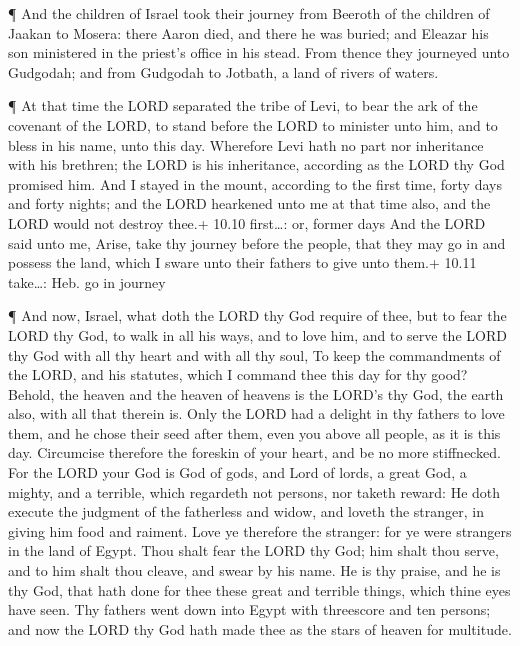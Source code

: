  ¶ And the children of Israel took their journey from
Beeroth of the children of Jaakan to Mosera: there Aaron died, and there
he was buried; and Eleazar his son ministered in the priest's office in
his stead.  From thence they journeyed unto Gudgodah; and
from Gudgodah to Jotbath, a land of rivers of waters.

 ¶ At that time the LORD separated the tribe of Levi, to
bear the ark of the covenant of the LORD, to stand before the LORD to
minister unto him, and to bless in his name, unto this day. 
Wherefore Levi hath no part nor inheritance with his brethren; the LORD
is his inheritance, according as the LORD thy God promised him.
 And I stayed in the mount, according to the first time,
forty days and forty nights; and the LORD hearkened unto me at that time
also, and the LORD would not destroy thee.+ 10.10 first\ldots: or,
former days  And the LORD said unto me, Arise, take thy
journey before the people, that they may go in and possess the land,
which I sware unto their fathers to give unto them.+ 10.11 take\ldots:
Heb. go in journey

 ¶ And now, Israel, what doth the LORD thy God require of
thee, but to fear the LORD thy God, to walk in all his ways, and to love
him, and to serve the LORD thy God with all thy heart and with all thy
soul,  To keep the commandments of the LORD, and his
statutes, which I command thee this day for thy good? 
Behold, the heaven and the heaven of heavens is the LORD's thy God, the
earth also, with all that therein is.  Only the LORD had a
delight in thy fathers to love them, and he chose their seed after them,
even you above all people, as it is this day.  Circumcise
therefore the foreskin of your heart, and be no more stiffnecked.
 For the LORD your God is God of gods, and Lord of lords, a
great God, a mighty, and a terrible, which regardeth not persons, nor
taketh reward:  He doth execute the judgment of the
fatherless and widow, and loveth the stranger, in giving him food and
raiment.  Love ye therefore the stranger: for ye were
strangers in the land of Egypt.  Thou shalt fear the LORD
thy God; him shalt thou serve, and to him shalt thou cleave, and swear
by his name.  He is thy praise, and he is thy God, that
hath done for thee these great and terrible things, which thine eyes
have seen.  Thy fathers went down into Egypt with
threescore and ten persons; and now the LORD thy God hath made thee as
the stars of heaven for multitude.

